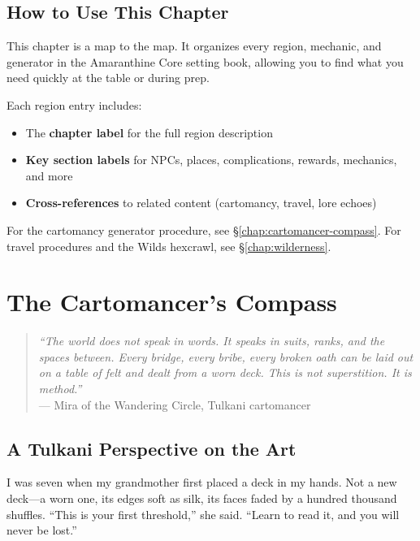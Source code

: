 \documentclass[12pt,oneside]{book}
\newcommand{\secref}[1]{§\ref{#1}}
\begin{document}
\section*{How to Use This Chapter}

This chapter is a map to the map. It organizes every region, mechanic, and generator in the Amaranthine Core setting book, allowing you to find what you need quickly at the table or during prep.

\medskip
\noindent
Each region entry includes:
\begin{itemize}
  \item The \textbf{chapter label} for the full region description
  \item \textbf{Key section labels} for NPCs, places, complications, rewards, mechanics, and more
  \item \textbf{Cross-references} to related content (cartomancy, travel, lore echoes)
\end{itemize}

\medskip
\noindent
For the cartomancy generator procedure, see \secref{chap:cartomancer-compass}. For travel procedures and the Wilds hexcrawl, see \secref{chap:wilderness}.


\chapter*{The Cartomancer's Compass}
\label{chap:cartomancer-compass}

\begin{quote}
\textit{``The world does not speak in words. It speaks in suits, ranks, and the spaces between. Every bridge, every bribe, every broken oath can be laid out on a table of felt and dealt from a worn deck. This is not superstition. It is method.''}\\
\hfill --- Mira of the Wandering Circle, Tulkani cartomancer
\end{quote}

\section*{A Tulkani Perspective on the Art}

I was seven when my grandmother first placed a deck in my hands. Not a new deck---a worn one, its edges soft as silk, its faces faded by a hundred thousand shuffles. ``This is your first threshold,'' she said. ``Learn to read it, and you will never be lost.''
\end{document}
